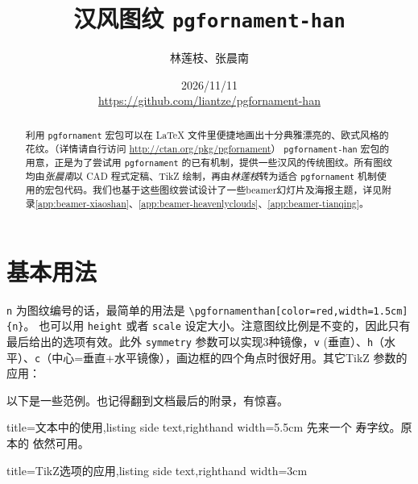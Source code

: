 \documentclass[fontset=fandol]{ctexart}
\title{汉风图纹 \texttt{pgfornament-han}}
\author{林莲枝、张晨南}
\date{2026/11/11\\\url{https://github.com/liantze/pgfornament-han}}
\newcommand{\latexinline}[1]{\lstinline|#1|}
\begin{document}
\maketitle

\begin{abstract}
利用 \texttt{pgfornament} 宏包可以在 \LaTeX{} 文件里便捷地画出十分典雅漂亮的、欧式风格的花纹。（详情请自行访问 \url{http://ctan.org/pkg/pgfornament}）
 \texttt{pgfornament-han} 宏包的用意，正是为了尝试用 \texttt{pgfornament} 的已有机制，提供一些汉风的传统图纹。所有图纹均由\emph{张晨南}以 CAD 程式定稿、TikZ 绘制，再由\emph{林莲枝}转为适合 \texttt{pgfornament} 机制使用的宏包代码。我们也基于这些图纹尝试设计了一些beamer幻灯片及海报主题，详见附录\ref{app:beamer-xiaoshan}、\ref{app:beamer-heavenlyclouds}、\ref{app:beamer-tianqing}。
\end{abstract}

\part{基本用法}

\texttt{n} 为图纹编号的话，最简单的用法是 \latexinline{\pgfornamenthan[color=red,width=1.5cm]{n}}。
也可以用 \texttt{height} 或者 \texttt{scale} 设定大小。注意图纹比例是不变的，因此只有最后给出的选项有效。此外 \texttt{symmetry} 参数可以实现3种镜像，\texttt{v} (垂直）、\texttt{h}（水平）、\texttt{c}（中心=垂直+水平镜像），画边框的四个角点时很好用。其它TikZ 参数的应用：

\begin{latexcode}
\end{latexcode}

以下是一些范例。也记得翻到文档最后的附录，有惊喜。

\bigskip

\begin{tcblisting}{title={文本中的使用},listing side text,righthand width=5.5cm}
先来一个 
寿字纹。原本的  依然可用。
\end{tcblisting}

\enlargethispage{\baselineskip}


\begin{tcblisting}{title={TikZ选项的应用},listing side text,righthand width=3cm}
\end{tcblisting}
\end{document}
